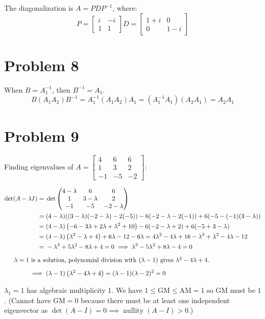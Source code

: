 \documentclass{article}
\newcommand{\alignedintertext}[1]{%
  \noalign{%
		\vskip\belowdisplayshortskip
		\vtop{\hsize=\linewidth#1\par
		\expandafter}
		\vskip\belowdisplayshortskip
		\expandafter\prevdepth\the\prevdepth
  }%
}
\newcommand*{\problem}[1]{\section*{Problem #1}}
\DeclareMathOperator{\nullity}{nullity}
\begin{document}
The diagonalization is $A=PDP^{-1}$, where:
\begin{equation*}
	P= \begin{bmatrix}
		i & -i \\
		1 & 1
	\end{bmatrix}
	D=\begin{bmatrix}
		1+i & 0 \\
		0 & 1-i
	\end{bmatrix}
\end{equation*}

\problem{8}
When $B=A_1^{-1}$, then $B^{-1}=A_1$.
\begin{equation*}
	B(A_1A_2)B^{-1}
	=A_1^{-1}(A_1A_2)A_1
	= \left(A_1^{-1}A_1\right)(A_2A_1)
	=A_2A_1
\end{equation*}

\problem{9}
Finding eigenvalues of $\displaystyle A=\begin{bmatrix}
	4 & 6 & 6 \\
	1 & 3 & 2 \\ 
	-1 & -5 & -2
\end{bmatrix}$:

$\begin{aligned}[t]
	\det(A-\lambda I)
	={}&\det \begin{pmatrix}
		4-\lambda & 6 & 6 \\
		1 & 3-\lambda & 2 \\
		-1 & -5 & -2-\lambda
	\end{pmatrix} \\
	={}&(4-\lambda)((3-\lambda)(-2-\lambda)-2(-5))-6(-2-\lambda-2(-1))+6(-5-(-1)(3-\lambda)) \\
	={}&(4-\lambda) \left(-6-3\lambda+2\lambda+\lambda^2+10\right)-6(-2-\lambda+2)+6(-5+3-\lambda) \\
	={}&(4-\lambda)\left(\lambda^2-\lambda+4\right)+6\lambda-12-6\lambda
	=4\lambda^2-4\lambda+16-\lambda^3+\lambda^2-4\lambda-12 \\
	={}&-\lambda^3+5\lambda^2-8\lambda+4=0 \implies \lambda^3-5\lambda^2+8\lambda-4=0 \\
	\alignedintertext{$\lambda=1$ is a solution, polynomial division with $(\lambda-1)$ gives $\lambda^2-4\lambda+4$.}
	\implies{}& (\lambda-1)\left(\lambda^2-4\lambda+4\right)
	=(\lambda-1)(\lambda-2)^2=0
\end{aligned}$

$\lambda_1=1$ has algebraic multiplicity 1. We have $1 \leq\mathrm{GM}\leq \mathrm{AM}=1$ so GM must be $1$. (Cannot have $\mathrm{GM}=0$ because there must be at least one independent eigenvector as $\det(A-I)=0\implies \nullity(A-I)>0$.)
\end{document}
